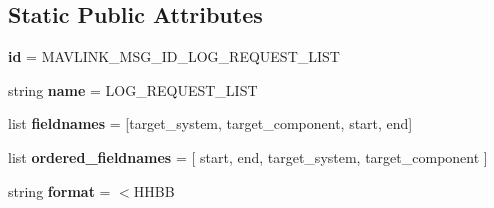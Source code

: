 \subsection*{Static Public Attributes}
\begin{DoxyCompactItemize}
\item 
\mbox{\label{classpymavlink_1_1dialects_1_1v10_1_1MAVLink__log__request__list__message_a86a17b04e480760822a81c3ce3e3eaf2}} 
{\bfseries id} = M\+A\+V\+L\+I\+N\+K\+\_\+\+M\+S\+G\+\_\+\+I\+D\+\_\+\+L\+O\+G\+\_\+\+R\+E\+Q\+U\+E\+S\+T\+\_\+\+L\+I\+ST
\item 
\mbox{\label{classpymavlink_1_1dialects_1_1v10_1_1MAVLink__log__request__list__message_a58f93ae06c14a5f81dfd3dd09bf9c755}} 
string {\bfseries name} = \textquotesingle{}L\+O\+G\+\_\+\+R\+E\+Q\+U\+E\+S\+T\+\_\+\+L\+I\+ST\textquotesingle{}
\item 
\mbox{\label{classpymavlink_1_1dialects_1_1v10_1_1MAVLink__log__request__list__message_a273be4b47beb4b9aa06cf08a8aeb0b59}} 
list {\bfseries fieldnames} = \mbox{[}\textquotesingle{}target\+\_\+system\textquotesingle{}, \textquotesingle{}target\+\_\+component\textquotesingle{}, \textquotesingle{}start\textquotesingle{}, \textquotesingle{}end\textquotesingle{}\mbox{]}
\item 
\mbox{\label{classpymavlink_1_1dialects_1_1v10_1_1MAVLink__log__request__list__message_a8f8ce0f634aa647f191dd1550a2f01cd}} 
list {\bfseries ordered\+\_\+fieldnames} = \mbox{[} \textquotesingle{}start\textquotesingle{}, \textquotesingle{}end\textquotesingle{}, \textquotesingle{}target\+\_\+system\textquotesingle{}, \textquotesingle{}target\+\_\+component\textquotesingle{} \mbox{]}
\item 
\mbox{\label{classpymavlink_1_1dialects_1_1v10_1_1MAVLink__log__request__list__message_aa18cd3ef272010650c4fb7f836a1cefe}} 
string {\bfseries format} = \textquotesingle{}$<$H\+H\+BB\textquotesingle{}
\item 
\mbox{\label{classpymavlink_1_1dialects_1_1v10_1_1MAVLink__log__request__list__message_a9cafbfb20abbc02a812843614d56d3d6}} 

\end{DoxyCompactItemize}
